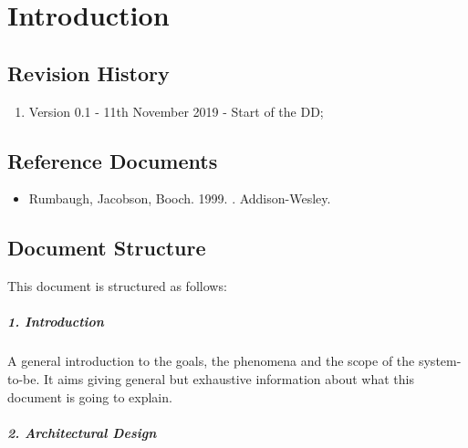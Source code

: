 \documentclass[../DD.tex]{subfiles}
\begin{document}
\chapter{Introduction}
\thispagestyle{fancy}
		
		
		
		
		\section{Revision History}
		\begin{enumerate}
			\item Version 0.1 - 11th November 2019 - Start of the DD;
			
			
		\end{enumerate}
		\section{Reference Documents}
		\begin{itemize}
			\item Rumbaugh, Jacobson, Booch. 1999. . Addison-Wesley.
		\end{itemize}
		\section{Document Structure}
		This document is structured as follows:
		\paragraph{1. Introduction}
		A general introduction to the goals, the phenomena and the scope of the system-to-be. It aims giving general but exhaustive information about what this document is going to explain.
		\paragraph{2. Architectural Design}
		
\end{document}
